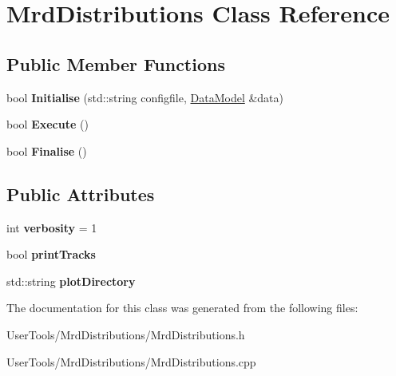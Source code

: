 \hypertarget{classMrdDistributions}{
\section{MrdDistributions Class Reference}
\label{classMrdDistributions}
}
\subsection*{Public Member Functions}
\begin{DoxyCompactItemize}
\item 
\hypertarget{classMrdDistributions_a0e32e324d6f93d4a45b6b313fc1fb735}{
bool {\bfseries Initialise} (std::string configfile, \hyperlink{classDataModel}{DataModel} \&data)}
\label{classMrdDistributions_a0e32e324d6f93d4a45b6b313fc1fb735}

\item 
\hypertarget{classMrdDistributions_a9d925095cb7ff1ede865837076da0b03}{
bool {\bfseries Execute} ()}
\label{classMrdDistributions_a9d925095cb7ff1ede865837076da0b03}

\item 
\hypertarget{classMrdDistributions_acb7753d5c69220fabc7f93c9bd6f3948}{
bool {\bfseries Finalise} ()}
\label{classMrdDistributions_acb7753d5c69220fabc7f93c9bd6f3948}

\end{DoxyCompactItemize}
\subsection*{Public Attributes}
\begin{DoxyCompactItemize}
\item 
\hypertarget{classMrdDistributions_a47f2a560f640c946ed721acdf093ab95}{
int {\bfseries verbosity} = 1}
\label{classMrdDistributions_a47f2a560f640c946ed721acdf093ab95}

\item 
\hypertarget{classMrdDistributions_acfa5709e73f4984f9bd4664d11e6ff39}{
bool {\bfseries printTracks}}
\label{classMrdDistributions_acfa5709e73f4984f9bd4664d11e6ff39}

\item 
\hypertarget{classMrdDistributions_a5b40d02e337e41a40f52f78624bca5d5}{
std::string {\bfseries plotDirectory}}
\label{classMrdDistributions_a5b40d02e337e41a40f52f78624bca5d5}

\end{DoxyCompactItemize}


The documentation for this class was generated from the following files:\begin{DoxyCompactItemize}
\item 
UserTools/MrdDistributions/MrdDistributions.h\item 
UserTools/MrdDistributions/MrdDistributions.cpp\end{DoxyCompactItemize}
